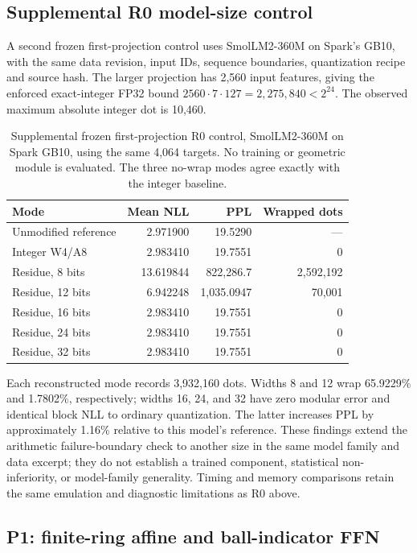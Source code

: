 \documentclass[11pt]{article}
\begin{document}
\subsection{Supplemental R0 model-size control}

A second frozen first-projection control uses SmolLM2-360M on Spark's GB10,
with the same data revision, input IDs, sequence boundaries, quantization
recipe and source hash. The larger projection has 2,560 input features, giving
the enforced exact-integer FP32 bound
\(2560\cdot7\cdot127=2{,}275{,}840<2^{24}\).
The observed maximum absolute integer dot is 10,460.

\begin{table}[htbp]
\centering
\small
\caption{Supplemental frozen first-projection R0 control, SmolLM2-360M on
Spark GB10, using the same 4,064 targets. No training or geometric module is
evaluated. The three no-wrap modes agree exactly with the integer baseline.}
\begin{tabular}{lrrr}
\toprule
Mode & Mean NLL & PPL & Wrapped dots\\
\midrule
Unmodified reference & 2.971900 & 19.5290 & ---\\
Integer W4/A8 & 2.983410 & 19.7551 & 0\\
Residue, 8 bits & 13.619844 & 822,286.7 & 2,592,192\\
Residue, 12 bits & 6.942248 & 1,035.0947 & 70,001\\
Residue, 16 bits & 2.983410 & 19.7551 & 0\\
Residue, 24 bits & 2.983410 & 19.7551 & 0\\
Residue, 32 bits & 2.983410 & 19.7551 & 0\\
\bottomrule
\end{tabular}
\label{tab:r0-360m}
\end{table}

Each reconstructed mode records 3,932,160 dots. Widths 8 and 12 wrap
65.9229\% and 1.7802\%, respectively; widths 16, 24, and 32 have zero modular
error and identical block NLL to ordinary quantization. The latter increases
PPL by approximately 1.16\% relative to this model's reference. These findings
extend the arithmetic failure-boundary check to another size in the same
model family and data excerpt; they do not establish a trained component,
statistical non-inferiority, or model-family generality. Timing and memory
comparisons retain the same emulation and diagnostic limitations as R0 above.

\subsection{P1: finite-ring affine and ball-indicator FFN}
\label{si:p1}
\end{document}
